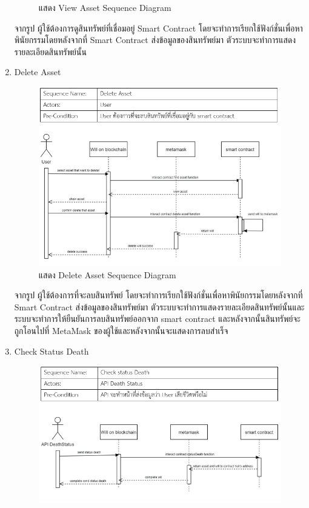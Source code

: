 \documentclass[12pt,oneside,openright,a4paper]{cpe-thai-project}
\begin{document}
\begin{enumerate}[label=\thesubsection.\arabic*,leftmargin=0pt,itemindent=2.5cm]
\begin{figure}[!thb]
			\caption{แสดง View Asset Sequence Diagram}
		\end{figure}
		\FloatBarrier
	\tab จากรูป ผู้ใช้ต้องการดูสินทรัพย์ที่เชื่อมอยู่ Smart Contract โดยจะทำการเรียกใช้ฟังก์ชั่นเพื่อหาพินัยกรรมโดยหลังจากที่ Smart Contract ส่งข้อมูลของสินทรัพย์มา ตัวระบบจะทำการแสดงรายละเอียดสินทรัพย์นั้น
	\item Delete Asset
		\begin{figure}[!thb]
			\centering
			\includegraphics[scale=0.6]{deleteAssetseq}
			\caption{แสดง Delete Asset Sequence Diagram}
		\end{figure}
		\FloatBarrier
	\tab จากรูป ผู้ใช้ต้องการที่จะลบสินทรัพย์ โดยจะทำการเรียกใช้ฟังก์ชั่นเพื่อหาพินัยกรรมโดยหลังจากที่ Smart Contract ส่งข้อมูลของสินทรัพย์มา ตัวระบบจะทำการแสดงรายละเอียดสินทรัพย์นั้นและระบบจะทำการให้ยืนยันการลบสินทรัพย์ออกจาก smart contract และหลังจากนั้นสินทรัพย์จะถูกโอนไปที่ MetaMask ของผู้ใช้และหลังจากนั้นจะแสดงการลบสำเร็จ
	\item Check Status Death
		\begin{figure}[!thb]
			\centering
			\includegraphics[scale=0.6]{checkStatusDeathseq}

\end{figure}
\end{enumerate}
\end{document}
